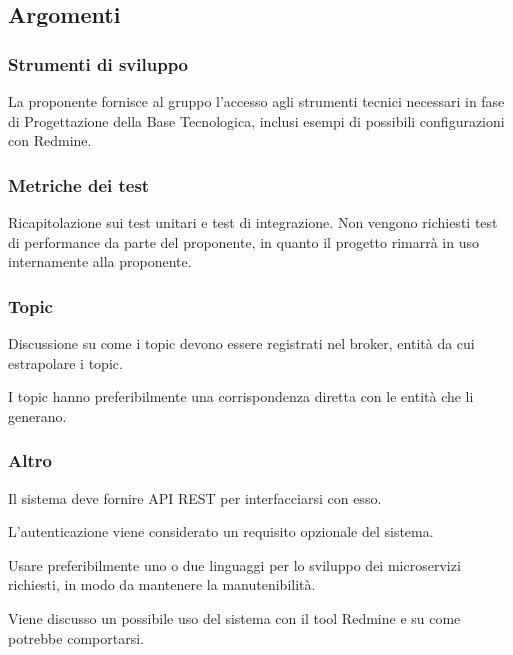         \subsection{Argomenti}
            \subsubsection{Strumenti di sviluppo}
            La proponente fornisce al gruppo l'accesso agli strumenti tecnici necessari in fase di Progettazione della Base Tecnologica, inclusi esempi di possibili configurazioni con Redmine.

            \subsubsection{Metriche dei test}
            Ricapitolazione sui test unitari e test di integrazione. Non vengono richiesti test di performance da parte del proponente, in quanto il progetto rimarrà in uso internamente alla proponente.
            
            \subsubsection{Topic}
            Discussione su come i topic devono essere registrati nel broker, entità da cui estrapolare i topic.\par
            I topic hanno preferibilmente una corrispondenza diretta con le entità che li generano.            
            
            \subsubsection{Altro}
            Il sistema deve fornire API REST per interfacciarsi con esso.\par
            L'autenticazione viene considerato un requisito opzionale del sistema.\par
            Usare preferibilmente uno o due linguaggi per lo sviluppo dei microservizi richiesti, in modo da mantenere la manutenibilità.\par
            Viene discusso un possibile uso del sistema con il tool Redmine e su come potrebbe comportarsi.


